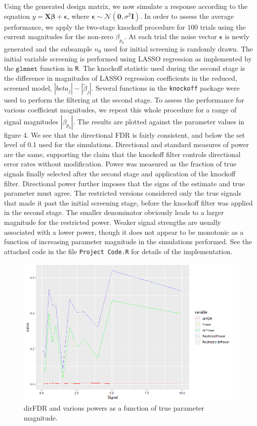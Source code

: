 \documentclass[]{scrartcl}
\newcommand{\1}[1]{\mathbbm{1}_{\left\{#1\right\}}}
\begin{document}
Using the generated design matrix, we now simulate a response according to the equation $y = \mathbf{X}\pmb{\beta} + \pmb{\epsilon}$, where $\pmb{\epsilon} \sim \mathcal{N}(\mathbf{0}, \sigma^{2}\mathbf{I})$. In order to assess the average performance, we apply the two-stage knockoff procedure for $100$ trials using the current magnitudes for the non-zero $\beta_{p_{0}}$. At each trial the noise vector $\pmb{\epsilon}$ is newly generated and the subsample $n_{0}$ used for initial screening is randomly drawn. The initial variable screening is performed using LASSO regression as implemented by the $\texttt{glmnet}$ function in \texttt{R}. The knockoff statistic used during the second stage is the difference in magnitudes of LASSO regression coefficients in the reduced, screened model, $|\hat{beta}_{j}| - |\tilde{\beta}_{j}|$. Several functions in the \texttt{knockoff} package were used to perform the filtering at the second stage. To assess the performance for various coefficient magnitudes, we repeat this whole procedure for a range of signal magnitudes $|\beta_{p_{0}}|$. The results are plotted against the parameter values in figure 4. We see that the directional FDR is fairly consistent, and below the set level of 0.1 used for the simulations. Directional and standard measures of power are the same, supporting the claim that the knockoff filter controls directional error rates without modification. Power was measured as the fraction of true signals finally selected after the second stage and application of the knockoff filter. Directional power further imposes that the signs of the estimate and true parameter must agree. The restricted versions considered only the true signals that made it past the initial screening stage, before the knockoff filter was applied in the second stage. The smaller denominator obviously leads to a larger magnitude for the restricted power. Weaker signal strengths are usually associated with a lower power, though it does not appear to be monotonic as a function of increasing parameter magnitude in the simulations performed. See the attached code in the file \texttt{Project Code.R} for details of the implementation.

\begin{figure}[h]
	\centering
	\includegraphics[width=\textwidth]{results_20}
	\caption{dirFDR and various powers as a function of true parameter magnitude.}
\end{figure}
\end{document}
